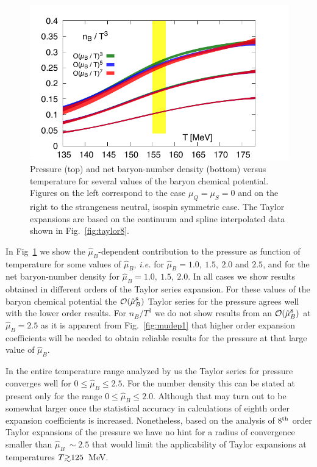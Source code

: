 \documentclass[pdflatex,prd,twocolumn,showpacs,superscriptaddress,nofootinbib]{revtex4-1}
\def\gsim{\raise0.3ex\hbox{$>$\kern-0.75em\raise-1.1ex\hbox{$\sim$}}}
\newcommand \hmu {\hat{\mu}}
\begin{document}
\begin{figure}[t]
\begin{center}
\includegraphics[scale=0.56]{fig/Temp_BQS100_muB_Order_r05.pdf}
\end{center}
\caption{Pressure (top) and net baryon-number density (bottom) versus temperature
for several values of the baryon chemical potential. Figures on the left correspond to the case $\mu_Q=\mu_S=0$ and on the right to
the strangeness neutral, isospin symmetric case.
The Taylor expansions are based on the continuum and spline interpolated data shown in Fig.~\ref{fig:taylor8}.
}
\label{fig:EoS}
\end{figure}


In Fig~\ref{fig:EoS} we show the $\hmu_B$-dependent contribution
to the pressure as function of
temperature for some values of $\hmu_B$, {\it i.e.} for $\hmu_B= 1.0,\ 1.5,\ 2.0$ and $2.5$, and for the  net baryon-number density
for $\hmu_B= 1.0,\ 1.5,\ 2.0$.
In all cases we show results
obtained in different orders of the Taylor series expansion. 
For these values of the baryon chemical potential the 
${\cal O}(\hmu_B^8)$ Taylor series for the pressure agrees well with the lower
order results. For $n_B/T^3$ we do not show results 
from an ${\cal O}(\hmu_B^8)$ at $\hmu_B=2.5$ as it is apparent 
from Fig.~\ref{fig:mudep1} that higher order expansion
coefficients will be needed to obtain reliable 
results for the pressure at that large value of $\hmu_B$.

In the entire temperature range analyzed by us
the Taylor series for pressure converges well for 
$0\le \hmu_B\le 2.5$. For the number density this can be 
stated at present only for the range $0\le \hmu_B\le 2.0$.
Although that may turn out to be somewhat larger once the 
statistical accuracy in calculations of eighth order expansion
coefficients is increased. Nonetheless,
based on the analysis of $8^{\rm th}$ order Taylor
expansions of the pressure we have no hint for a
radius of convergence
smaller than $\hmu_B\ \sim 2.5$ that would limit the
applicability of Taylor expansions at temperatures 
$T\gsim 125$~MeV. 
\end{document}
